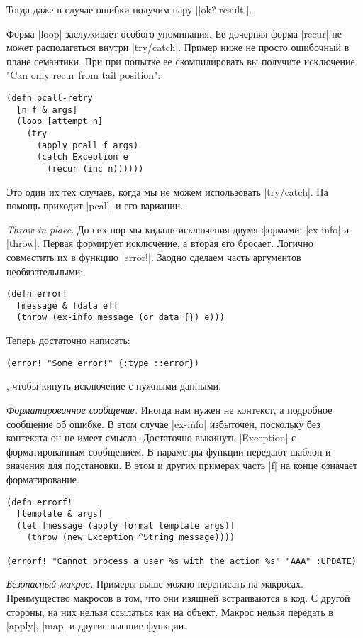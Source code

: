 Тогда даже в случае ошибки получим пару \spverb|[ok? result]|.

Форма \spverb|loop| заслуживает особого упоминания. Ее дочерняя форма \spverb|recur| не может
располагаться внутри \spverb|try/catch|. Пример ниже не просто ошибочный в плане
семантики. При при попытке ее скомпилировать вы получите исключение "Can only
recur from tail position":

\begin{verbatim}
(defn pcall-retry
  [n f & args]
  (loop [attempt n]
    (try
      (apply pcall f args)
      (catch Exception e
        (recur (inc n))))))
\end{verbatim}

Это один их тех случаев, когда мы не можем использовать \spverb|try/catch|. На помощь
приходит \spverb|pcall| и его вариации.

\emph{Throw in place.} До сих пор мы кидали исключения двумя формами: \spverb|ex-info| и
\spverb|throw|. Первая формирует исключение, а вторая его бросает. Логично совместить
их в функцию \spverb|error!|. Заодно сделаем часть аргументов необязательными:

\begin{verbatim}
(defn error!
  [message & [data e]]
  (throw (ex-info message (or data {}) e)))
\end{verbatim}

Теперь достаточно написать:

\begin{verbatim}
(error! "Some error!" {:type ::error})
\end{verbatim}

, чтобы кинуть исключение с нужными данными.

\emph{Форматированное сообщение.} Иногда нам нужен не контекст, а подробное
сообщение об ошибке. В этом случае \spverb|ex-info| избыточен, поскольку без контекста
он не имеет смысла. Достаточно выкинуть \spverb|Exception| с форматированным
сообщением. В параметры функции передают шаблон и значения для подстановки. В
этом и других примерах часть \spverb|f| на конце означает форматирование.

\begin{verbatim}
(defn errorf!
  [template & args]
  (let [message (apply format template args)]
    (throw (new Exception ^String message))))

(errorf! "Cannot process a user %s with the action %s" "AAA" :UPDATE)
\end{verbatim}

\emph{Безопасный макрос.} Примеры выше можно переписать на макросах. Преимущество
макросов в том, что они изящней встраиваются в код. С другой стороны, на них
нельзя ссылаться как на объект. Макрос нельзя передать в \spverb|apply|, \spverb|map| и другие
высшие функции.


